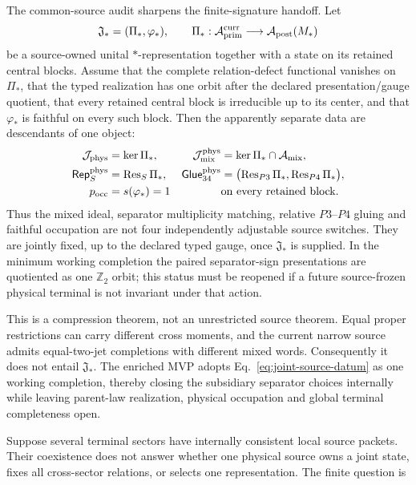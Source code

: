 \documentclass[11pt]{article}
\begin{document}
The common-source audit sharpens the finite-signature handoff.  Let
\begin{equation}
 \mathfrak J_*=(\Pi_*,\varphi_*),
 \qquad
 \Pi_*:\mathcal A_{\rm prim}^{\rm curr}
 \longrightarrow \mathcal A_{\rm post}(M_*)
 \label{eq:joint-source-datum}
\end{equation}
be a source-owned unital $*$-representation together with a state on its
retained central blocks.  Assume that the complete relation-defect functional
vanishes on $\Pi_*$, that the typed realization has one orbit after the
declared presentation/gauge quotient, that every retained central block is
irreducible up to its center, and that $\varphi_*$ is faithful on every such
block.  Then the apparently separate data are descendants of one object:
\begin{align}
 \mathcal J_{\rm phys}&=\ker\Pi_* ,&
 \mathcal J_{\rm mix}^{\rm phys}
   &=\ker\Pi_*\cap\mathcal A_{\rm mix},\nonumber\\
 \mathsf{Rep}^{\rm phys}_S&=\operatorname{Res}_S\Pi_* ,&
 \mathsf{Glue}_{34}^{\rm phys}
   &=\bigl(\operatorname{Res}_{P3}\Pi_*,
           \operatorname{Res}_{P4}\Pi_*\bigr),
 \label{eq:joint-source-descendants}\\
 p_{\rm occ}&=s(\varphi_*)=1
 &&\text{on every retained block}.\nonumber
\end{align}
Thus the mixed ideal, separator multiplicity matching, relative $P3$--$P4$
gluing and faithful occupation are not four independently adjustable source
switches.  They are jointly fixed, up to the declared typed gauge, once
$\mathfrak J_*$ is supplied.  In the minimum working completion the paired
separator-sign presentations are quotiented as one $\mathbb Z_2$ orbit; this
status must be reopened if a future source-frozen physical terminal is not
invariant under that action.

This is a compression theorem, not an unrestricted source theorem.  Equal
proper restrictions can carry different cross moments, and the current
narrow source admits equal-two-jet completions with different mixed words.
Consequently it does not entail $\mathfrak J_*$.  The enriched MVP adopts
Eq.~\eqref{eq:joint-source-datum} as one working completion, thereby closing
the subsidiary separator choices internally while leaving parent-law
realization, physical occupation and global terminal completeness open.

Suppose several terminal sectors have internally consistent local source
packets.  Their coexistence does not answer whether one physical source owns a
joint state, fixes all cross-sector relations, or selects one representation.
The finite question is
\begin{center}
\end{center}
\end{document}
